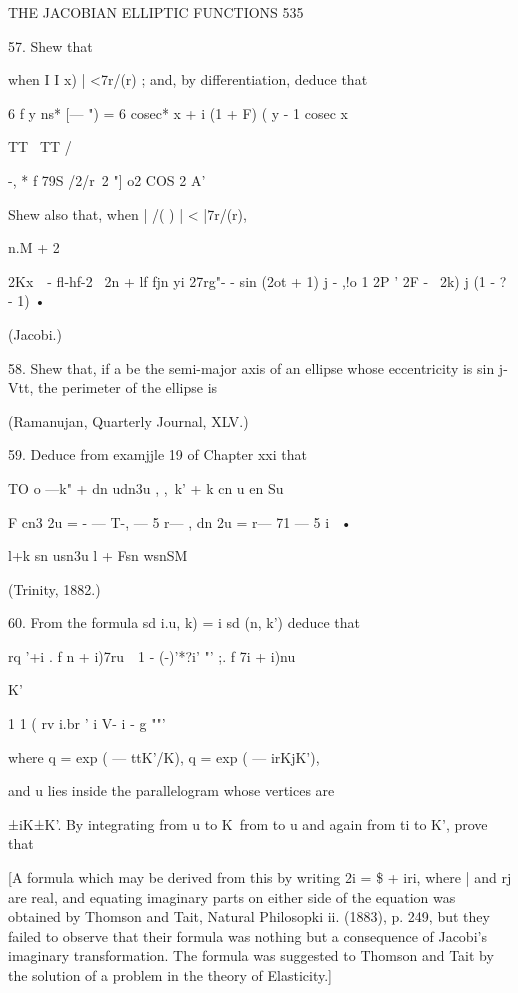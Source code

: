 THE JACOBIAN ELLIPTIC FUNCTIONS 535 

57. Shew that 

when I I x) | <7r/(r) ; and, by differentiation, deduce that 

6 f y ns* [— ") = 6 cosec* x + i (1 + F) ( y - 1 cosec  x 

TT \ TT / 

 -, * f  79S /2/r\ 2  "] o2  COS 2 A' 

Shew also that, when | /( ) | < |7r/(r), 



n.M + 2 



2Kx\ \  - fl-hf-2 \   2n + lf fjn yi 27rg"- - sin (2ot + 1)   
 j - ,!o 1 2P ' 2F - \ 2k) j   (1 - ?  - 1) • 

(Jacobi.) 

58. Shew that, if a be the semi-major axis of an ellipse whose eccentricity is sin j-Vtt, 
the perimeter of the ellipse is 

(Ramanujan, Quarterly Journal, XLV.) 

59. Deduce from examjjle 19 of Chapter xxi that 

TO o —k"  + dn udn3u , ,\  k'  + k  cn  u en Su 

F cn3 2u = - — T-, — 5 r— , dn  2u =  r— 71 — 5  i~ • 

l+k sn usn3u l + Fsn wsnSM 

(Trinity, 1882.) 

60. From the formula sd  i.u, k) = i sd (n, k') deduce that 

rq '+i .   f n + i)7ru\ \   1 - (-)'*?i' "'  ;.  f 7i + i)nu  

K' 



1 1 ( rv i.br ' i V- i  - g ""' 



where q = exp ( — ttK'/K), q  = exp ( — irKjK'), 

and u lies inside the parallelogram whose vertices are 

±iK±K'. 
By integrating from u to K\ from to u and again from ti to K', prove that 

[A formula which may be derived from this by writing 2i = \$ + iri, where | and rj are 
real, and equating imaginary parts on either side of the equation was obtained by Thomson 
and Tait, Natural Philosopki  ii. (1883), p. 249, but they failed to observe that their formula 
was nothing but a consequence of Jacobi's imaginary transformation. The formula was 
suggested to Thomson and Tait by the solution of a problem in the theory of Elasticity.] 

